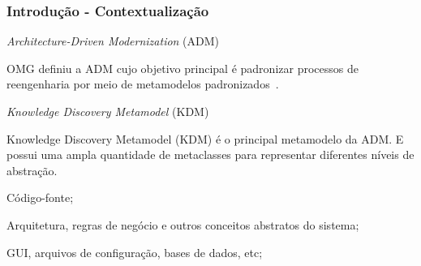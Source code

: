 \documentclass{beamer}
\begin{document}
\begin{frame}\frametitle{Introdução - Contextualização}

\begin{block}{\textit{Architecture-Driven Modernization} (ADM)}
\begin{minipage}[b]{10.80cm}
OMG definiu a ADM cujo objetivo principal é padronizar processos de reengenharia por meio de metamodelos padronizados~\cite{KDM:specification,KDM:ISO}.
\end{minipage}  
\end{block}

\begin{block}{\textit{Knowledge Discovery Metamodel} (KDM)}
\begin{minipage}[b]{10.80cm}
Knowledge Discovery Metamodel (KDM) é o principal metamodelo da ADM. E possui uma ampla quantidade de metaclasses para representar diferentes níveis de abstração.
\end{minipage}  
\end{block}

\begin{itemize}
    \begin{minipage}[b]{9.8cm} \item Código-fonte; 
    \vspace{.2cm}
    \end{minipage}
    \begin{minipage}[b]{9.8cm} \item Arquitetura, regras de negócio e outros conceitos abstratos do sistema; 
    \vspace{.2cm}
    \end{minipage}
    \begin{minipage}[b]{9.8cm} \item GUI, arquivos de configuração, bases de dados, etc; 
    \vspace{.2cm}
    \end{minipage}
\end{itemize}

\end{frame}
\end{document}
